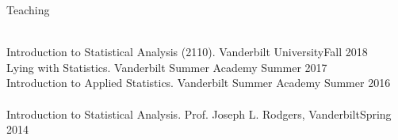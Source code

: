 \begin{rSection}{\textrm{Teaching}}
\begin{comment}
Methods in Psychological Research (210/310). Wake Forest University \hfill{Spring 2022; Fall 2024, \textit{Fall 2025}}\\
Data Science for Psychologists in \R (703). Wake Forest University\hfill{Spring 2023\textsuperscript{*}, Spring 2025}
\hspace*{6 mm} \href{https://datascience4psych.github.io/DataScience4Psych/}{\color{blue} datascience4psych.github.io/DataScience4Psych}\hfill{Spring 2021\textsuperscript{*}; Spring 2022}\smallskip\\
Psychological Testing  (362). Wake Forest University \hfill{Spring 2020;\textsuperscript{*} \href{https://www.youtube.com/playlist?list=PLKrrdtYgOUYYgag4erySD7L0jDcZGMlS_}{\color{blue}Spring 2021\noteBns}}
\hspace* {6 mm} \href{https://r-computing-lab.github.io/psychtesting/}{\color{blue} r-computing-lab.github.io/psychtesting}\smallskip\\
Personality (255). Wake Forest University \href{https://smasongarrison.github.io/personality/}{\color{blue} smasongarrison.github.io/personality}\hfill{Fall 2021; \href{https://www.youtube.com/playlist?list=PLKrrdtYgOUYZpENpYddjG8n_q3bfbx8Kr}{Fall 2022x2\noteBns}}\hfill{Fall 2019; Spring 2020;\textsuperscript{*} \href{https://www.youtube.com/playlist?list=PLKrrdtYgOUYZpENpYddjG8n_q3bfbx8Kr}{\color{blue}Fall 2020x2\textsuperscript{*}\noteBns}}\\
\end{comment}
\hspace* {6 mm}\smallskip\\
Introduction to Statistical Analysis (2110). Vanderbilt University\hfill {Fall 2018}\\
Lying with Statistics. Vanderbilt Summer Academy \hfill{Summer 2017}\\
Introduction to Applied Statistics. Vanderbilt Summer Academy \hfill{Summer 2016}\smallskip\\
\\
Introduction to Statistical Analysis. Prof. Joseph L. Rodgers, Vanderbilt\hfill{Spring 2014}\\

\end{rSection}
